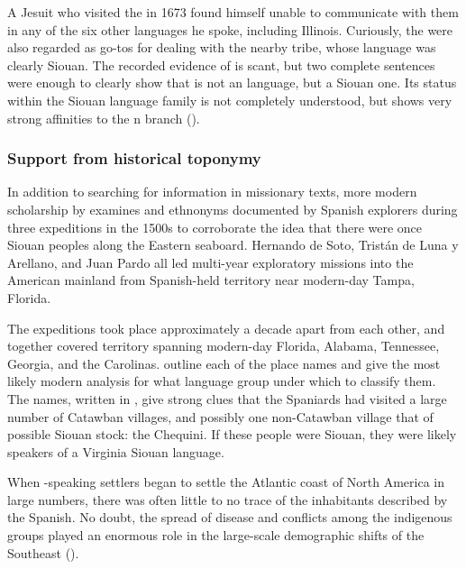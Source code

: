 \documentclass[output=paper]{LSP/langsci}
\begin{document}
A Jesuit who visited the  in 1673 found himself unable to communicate with them in any of the six other languages he spoke, including Illinois. Curiously, the  were also regarded as go-tos for dealing with the nearby  tribe, whose language was clearly Siouan. The recorded evidence of  is scant, but two complete sentences were enough to clearly show that  is not an  language, but a Siouan one. Its status within the Siouan language family is not completely understood, but  shows very strong affinities to the n branch (\citealt{Koontz1995a,Koontz1995b}).

\subsubsection{Support from historical toponymy} In addition to searching for information in missionary texts, more modern scholarship by \citet{BookerEtAl1992} examines  and ethnonyms documented by Spanish explorers during three expeditions in the 1500s to corroborate the idea that there were once Siouan peoples along the Eastern seaboard. Hernando de Soto, Trist\'an de Luna y Arellano, and Juan Pardo all led multi-year exploratory missions into the American mainland from Spanish-held territory near modern-day Tampa, Florida. 

The expeditions took place approximately a decade apart from each other, and together covered territory spanning modern-day Florida, Alabama, Tennessee, Georgia, and the Carolinas. \citet{BookerEtAl1992} outline each of the place names and give the most likely modern analysis for what language group under which to classify them. The names, written in  , give strong clues that the Spaniards had visited a large number of Catawban villages, and possibly one non-Catawban village that of possible Siouan stock: the Chequini. If these people were Siouan, they were likely speakers of a Virginia Siouan language.

When -speaking settlers began to settle the Atlantic coast of North America in large numbers, there was often little to no trace of the inhabitants described by the Spanish. No doubt, the spread of disease and conflicts among the indigenous groups played an enormous role in the large-scale demographic shifts of the Southeast (\citealt{Mann2006}). 
\end{document}
